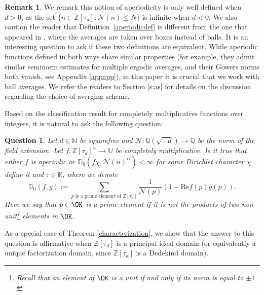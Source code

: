 \documentclass[11pt]{amsart}
\newtheorem{question}{Question}
\theoremstyle{definition}
\newtheorem*{remark}{Remark}
\newcommand{\D}{{\mathbb D}}
\newcommand{\N}{{\mathbb N}}
\newcommand{\NN}{{\mathcal N}}
\newcommand{\Q}{{\mathbb Q}}
\newcommand{\R}{{\mathbb R}}
\newcommand{\Z}{{\mathbb Z}}
\newcommand{\U}{{\mathbb U}}
\newcommand{\e}{\epsilon}
\begin{document}
\begin{remark}
    We remark this notion of aperiodicity is only well defined when $d>0$, as the set $\{n\in\Z[\tau_{d}]\colon \NN(n)\leq N\}$ is infinite when $d<0$.
We also caution the reader that Definition~\ref{aperiodicdef} is different from the one that appeared in \cite{S23}, where the averages are taken over boxes instead of balls. 
It is an interesting question to ask if these two definitions are equivalent. While aperiodic functions defined in both ways share similar properties (for example, they admit similar seminorm estimates for multiple ergodic averages, and their Gowers norms both vanish, see Appendix \ref{appapp}), in this paper it is crucial that we work with ball averages. We refer the readers to Section \ref{s:as} for details on the discussion regarding the choice of averging scheme.

\end{remark}


 

\iffalse
 
Based on the classification result for completely multiplicative functions over integers,
it is natural to ask the following question:

\begin{question}
    Let  $d\in\N$ be squarefree and $\NN\colon \Q(\sqrt{-d})\to \Q$ be the norm of the field extension. Let $f\colon \Z[\tau_{d}]^{\times}\to\U$  be completely multiplicative. %
    Is it true that either $f$ is aperiodic or $\D_{0}(f\chi,\NN(n)^{i\tau})<\infty$ for some Dirichlet character $\chi$ {\color{red} define it} and $\tau\in\R$, where we denote  
    $$\D_{0}(f,g):=\sum_{p \text{ is a prime element of } \Z[\tau_{d}]}\frac{1}{\NN(p)}(1-\text{Re}f(p)\overline{g}(p)).$$
    Here we say that $p\in\OK$ is a \emph{prime element} if it is not the products of two non-unit\footnote{Recall that an element of $\OK$ is a unit if and only if its norm is equal to $\pm 1$} elements in $\OK$.
\end{question}
As a special case of Theorem \ref{characterization}, we show that the answer to this question is affirmative when $\Z[\tau_{d}]$ is a principal ideal domain  (or equivalently a unique factorization domain, since $\Z[\tau_d]$ is a Dedekind domain).
\end{document}
